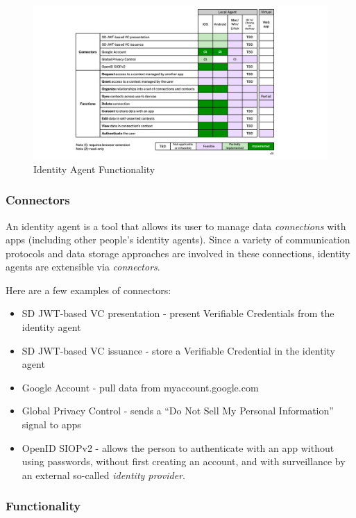 \documentclass[11pt, oneside]{article}   	%
\begin{document}
\begin{figure}[htbp]
\includegraphics[width=\textwidth]{./images/identity-agent-functionality.png}
\caption{Identity Agent Functionality}
\label{fig:functionality}
\end{figure}

\subsubsection{Connectors}

An identity agent is a tool that allows its user to manage data \emph{connections} with apps (including other people's identity agents). Since a variety of communication protocols and data storage approaches are involved in these connections, identity agents are extensible via \emph{connectors}. 

Here are a few examples of connectors:
\begin{itemize}
\item SD JWT-based VC presentation - present Verifiable Credentials from the identity agent
\item SD JWT-based VC issuance - store a Verifiable Credential in the identity agent
\item Google Account - pull data from myaccount.google.com 
\item Global Privacy Control - sends a ``Do Not Sell My Personal Information'' signal to apps
\item OpenID SIOPv2 - allows the person to authenticate with an app without using passwords, without first creating an account, and with surveillance by an external so-called \emph{identity provider}.
\end{itemize}

\subsubsection{Functionality}
\end{document}
